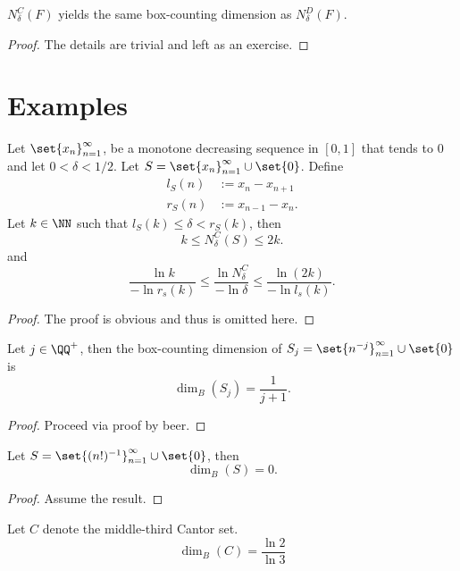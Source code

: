 \begin{thm}
	$N^C_\delta(F)$ yields the same box-counting dimension as $N^D_\delta(F)$.
\end{thm}
\begin{proof}
	The details are trivial and left as an exercise.
\end{proof}

\section{Examples}

\begin{lemma}
	Let $\set{x_n}_{n=1}^\infty$, be a monotone decreasing sequence in $[0,1]$ that tends to 0 and let $0 < \delta < 1/2$.
	Let $S=\set{x_n}_{n=1}^\infty\cup\set{0}$.
	Define
	\begin{align*}
		l_S(n)&:= x_n-x_{n+1}\\
		r_S(n)&:= x_{n-1}-x_n.
	\end{align*}
	Let $k\in\NN$ such that $l_S(k)\leq \delta < r_S(k)$, then
	\[
		k \leq N^C_\delta(S)\leq 2k.
	\]
	and
	\[
		\frac{\ln k}{-\ln r_s(k)}\leq \frac{\ln N^C_\delta}{-\ln\delta}\leq\frac{\ln (2k)}{-\ln l_s(k)}.
	\]
\end{lemma}
\begin{proof}
	The proof is obvious and thus is omitted here.
\end{proof}

\begin{example}
	Let $j\in\QQ^+$, then the box-counting dimension of $S_j=\set{n^{-j}}_{n=1}^\infty\cup\set{0}$ is
	\[
		\dim_B(S_j)=\frac{1}{j+1}.
	\]
\end{example}
\begin{proof}
	Proceed via proof by beer.
\end{proof}

\begin{example}
	Let $S=\set{(n!)^{-1}}_{n=1}^\infty\cup\set{0}$, then
	\[
		\dim_B(S)=0.
	\]
\end{example}
\begin{proof}
	Assume the result.
\end{proof}

\begin{example}
	Let $C$ denote the middle-third Cantor set.
	\[
		\dim_B(C)=\frac{\ln2}{\ln3}
	\]
\end{example}

